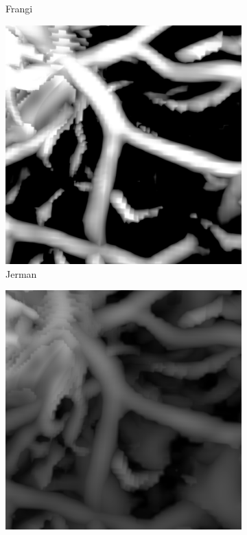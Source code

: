 \begin{figure}[!ht]
\begin{subfigure}[t]{0.30\textwidth}
        \caption{Frangi}
      \end{subfigure}
      \begin{subfigure}[t]{0.30\textwidth}
        \includegraphics[clip = true, trim  = 0 50 0 80, width=\textwidth]{Images/Ircad_k_Jerman.png}
        \caption{Jerman}
      \end{subfigure}
      \begin{subfigure}[t]{0.30\textwidth}
        \includegraphics[clip = true, trim  = 0 50 0 80, width=\textwidth]{Images/Ircad_k_OOF_GM.png}

\end{subfigure}
\end{figure}
